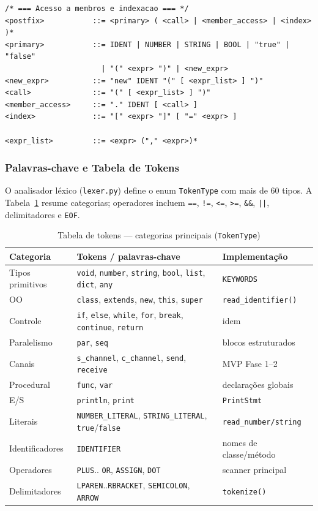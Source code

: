 \documentclass[12pt]{article}
\begin{document}
\begin{lstlisting}[caption={BNF MiniPar 2026.1 OO (gramática formal completa)}]
/* === Acesso a membros e indexacao === */
<postfix>           ::= <primary> ( <call> | <member_access> | <index> )*
<primary>           ::= IDENT | NUMBER | STRING | BOOL | "true" | "false"
                      | "(" <expr> ")" | <new_expr>
<new_expr>          ::= "new" IDENT "(" [ <expr_list> ] ")"
<call>              ::= "(" [ <expr_list> ] ")"
<member_access>     ::= "." IDENT [ <call> ]
<index>             ::= "[" <expr> "]" [ "=" <expr> ]

<expr_list>         ::= <expr> ("," <expr>)*
\end{lstlisting}

\subsubsection{Palavras-chave e Tabela de Tokens}

O analisador léxico (\texttt{lexer.py}) define o enum \texttt{TokenType} com mais de 60 tipos. A Tabela~\ref{tab:tokens} resume categorias; operadores incluem \texttt{==}, \texttt{!=}, \texttt{<=}, \texttt{>=}, \texttt{\&\&}, \texttt{||}, delimitadores e \texttt{EOF}.

\begin{table}[htbp]
\centering
\caption{Tabela de tokens --- categorias principais (\texttt{TokenType})}
\label{tab:tokens}
\begin{tabular}{|l|l|l|}
\hline
\textbf{Categoria} & \textbf{Tokens / palavras-chave} & \textbf{Implementação} \\
\hline
Tipos primitivos & \texttt{void}, \texttt{number}, \texttt{string}, \texttt{bool}, \texttt{list}, \texttt{dict}, \texttt{any} & \texttt{KEYWORDS} \\
OO & \texttt{class}, \texttt{extends}, \texttt{new}, \texttt{this}, \texttt{super} & \texttt{read\_identifier()} \\
Controle & \texttt{if}, \texttt{else}, \texttt{while}, \texttt{for}, \texttt{break}, \texttt{continue}, \texttt{return} & idem \\
Paralelismo & \texttt{par}, \texttt{seq} & blocos estruturados \\
Canais & \texttt{s\_channel}, \texttt{c\_channel}, \texttt{send}, \texttt{receive} & MVP Fase 1--2 \\
Procedural & \texttt{func}, \texttt{var} & declarações globais \\
E/S & \texttt{println}, \texttt{print} & \texttt{PrintStmt} \\
Literais & \texttt{NUMBER\_LITERAL}, \texttt{STRING\_LITERAL}, \texttt{true}/\texttt{false} & \texttt{read\_number/string} \\
Identificadores & \texttt{IDENTIFIER} & nomes de classe/método \\
Operadores & \texttt{PLUS}.. \texttt{OR}, \texttt{ASSIGN}, \texttt{DOT} & scanner principal \\
Delimitadores & \texttt{LPAREN}..\texttt{RBRACKET}, \texttt{SEMICOLON}, \texttt{ARROW} & \texttt{tokenize()} \\
\hline
\end{tabular}
\end{table}
\end{document}
